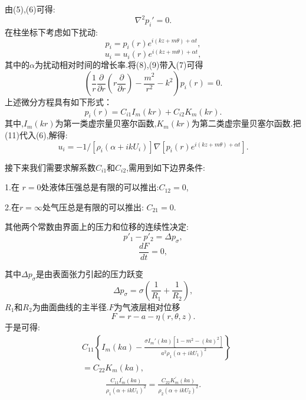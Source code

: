 \documentclass[UTF8]{gapd}
\begin{document}
由(5),(6)可得:
\begin{equation}
\nabla ^2p_i'=0.
\end{equation}
在柱坐标下考虑如下扰动:
\begin{equation}
p_{i}=p_{i}(r) e^{i(k z+m \theta)+\alpha t},
\end{equation}
\begin{equation}
u_{i}=u_{i}(r) e^{i(k z+m \theta)+\alpha t},
\end{equation}
其中的$\alpha$为扰动相对时间的增长率.将(8),(9)带入(7)可得
\begin{equation}
\left(\frac{1}{r} \frac{\partial}{\partial r} (r \frac{\partial}{\partial r})-\frac{m^{2}}{r^{2}}-k^{2}\right) p_{i}(r)=0.
\end{equation}
上述微分方程具有如下形式：
\begin{equation}
p_{i}(r)=C_{i 1} I_{m}(k r)+C_{i 2} K_{m}(k r).
\end{equation}
其中,$I_m(kr)$为第一类虚宗量贝塞尔函数,$K_m(kr)$为第二类虚宗量贝塞尔函数.把(11)代入(6),解得:
\begin{equation}
{u}_{i}=-1 /\left[\rho_{i}\left(\alpha+i k U_{i}\right)\right] \nabla\left[p_{i}(r) e^{i(k z+m \theta)+\alpha t}\right].
\end{equation}

接下来我们需要求解系数$C_{i1}$和$C_{i2}$,需用到如下边界条件:

\noindent 1.在 $r=0$处液体压强总是有限的可以推出:$C_{12}=0$,

\noindent 2.在$r=\infty$处气压总是有限的可以推出: $C_{21}=0$.

其他两个常数由界面上的压力和位移的连续性决定:
\begin{equation}
p'_1-p'_2=\Delta p_{\sigma},
\end{equation}
\begin{equation}
\frac{dF}{dt}=0,
\end{equation}

其中$\Delta p_{\sigma}$是由表面张力引起的压力跃变
\begin{equation}
\Delta p_{\sigma}=\sigma\left(\frac{1}{R_{1}}+\frac{1}{R_{2}}\right),
\end{equation}
$R_{1}$和$R_{2}$为曲面曲线的主半径.$F$为气液层相对位移
\begin{equation}
	F=r-a-\eta(r, \theta, z).
\end{equation}
于是可得:
\begin{equation}
\begin{split}
&C_{11}\left\{I_{m}(k a)-\frac{\sigma I_m'(ka)\left[1-m^{2}-(k a)^{2}\right]}{a^{2}\rho_{1}\left(\alpha+i k U_{1}\right)^{2}}\right\}\\
&=C_{22} K_{m}(k a),
\end{split}
\end{equation}
\begin{equation}
\begin{split}
\frac{C_{11} I_{m}^{\prime}(k a)}{ \rho_{1}\left(\alpha+i k U_{1}\right)^{2}}=\frac{C_{22} K_{m}^{\prime}(k a)}{\rho_{2}\left(\alpha+i k U_{2}\right)^{2}}.
\end{split}
\end{equation}
\end{document}
